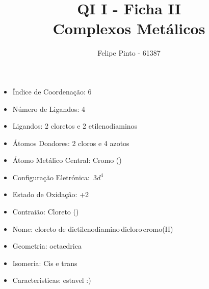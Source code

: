 \documentclass[12pt]{article}
\begin{document}
\title{ \bfseries\color{DarkGreen!75}
	  QI I 
	- Ficha II
	\\Complexos Metálicos
}
\author{Felipe Pinto - 61387}

\maketitle
\tableofcontents
\break

\section{}

\noindent\begin{minipage}{\textwidth}
	
	\subsection{}
	\begin{itemize}
   
   \item Índice de Coordenação:
   	6
   
   \item Número de Ligandos:
   	4	
	
   \item Ligandos:
   	2 cloretos e 2 etilenodiaminos
   	
   \item Átomos Doadores:
   	2 cloros e 4 azotos
   
   \item Átomo Metálico Central:
   	Cromo ()
   
   \item Configuração Eletrónica:
   	\ch{[Ar]}$\, 3d^4$
   
   \item Estado de Oxidação:
   	+2
   
   \item Contraião:
   	Cloreto ()
   
   \item Nome:
   	cloreto de dietilenodiamino\,dicloro\,cromo(II)
   
   \item Geometria:
   	octaedrica\vspace{0.3cm}\\
		
   
   \item Isomeria:
		Cis e trans
	\item Caracteristicas:
		estavel :)
	\end{itemize}
	
\end{minipage}
\end{document}
